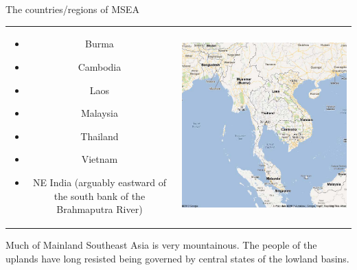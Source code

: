 \documentclass{beamer}
\begin{document}
\begin{frame}{The countries/regions of MSEA}

  \begin{tabular}{cc}

    \begin{minipage}[b]{0.45\textwidth}\raggedright
      \begin{itemize}
      \item Burma
      \item Cambodia
      \item Laos
      \item Malaysia
      \item Thailand
      \item Vietnam
      \item NE India (arguably eastward of the
        south bank of the Brahmaputra River)
      \end{itemize}
\end{minipage} &
                 \begin{minipage}[b]{0.45\textwidth}
 \includegraphics[width=\textwidth]{pics/image2.png}
 \end{minipage} 
  \end{tabular}

  \medskip

  Much of Mainland Southeast Asia is very mountainous.  The people of the uplands have long resisted  being governed by central states of the lowland basins.

  
\end{frame}
\end{document}
